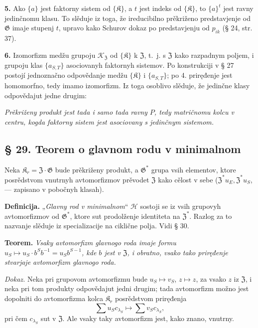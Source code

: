 \documentclass[11pt]{article}
\begin{document}
\noindent\textbf{5.} Ako \(\{a\}\) jest faktorny sistem od \(\{\mathfrak K\}\), a \(t\) jest indeks od \(\{\mathfrak K\}\), to \(\{a\}^t\) jest ravny jedinčnomu klasu. To slěduje iz toga, že ireducibilno prěkriženo predstavjenje od \(\mathfrak G\) imaje stupenj \(t\), upravo kako Schurov dokaz po predstavjenju od \(p_{ik}\) (§ 24, str. 37).

\noindent\textbf{6.} Izomorfizm medžu grupoju \(\mathscr K_{\mathfrak Z}\) od \(\{\mathfrak K\}\) k \(\mathfrak Z\), t.~j. s \(\mathfrak Z\) kako razpadnym poljem, i grupoju klas \(\{a_{S,T}\}\) asociovanyh faktornyh sistemov. Po konstrukciji v § 27 postojí jednoznačno odpovědanje medžu \(\{\mathfrak K\}\) i \(\{a_{S,T}\}\); po 4. priręđenje jest homomorfno, tedy imamo izomorfizm. Iz toga osoblivo slěduje, že jedinčne klasy odpovědajut jedne drugim:

\noindent\emph{Prěkriženy produkt jest tada i samo tada ravny \(P\), tedy matričnomu kolcu v centru, kogda faktorny sistem jest asociovany s jedinčnym sistemom.}

\subsection*{§ 29. Teorem o glavnom rodu v minimalnom}\label{hauptgeschlechtssatz-im-minimalen}

Neka \(\mathfrak K_r=\mathfrak Z\cdot\mathfrak G\) bude prěkriženy produkt, a \(\mathfrak G^*\) grupa vsih elementov, ktore posrědstvom vnutrnyh avtomorfizmov prěvodet \(\mathfrak Z\) kako cělost v sebe (\(\mathfrak Z^*u_E,\mathfrak Z^*u_S\), --- zapisano v pobočnyh klasah).

\noindent\textbf{Definicija.} „\emph{Glavny rod v minimalnom}“ \(\mathscr H\) sostoji se iz vsih grupovyh avtomorfizmov od \(\mathfrak G^*\), ktore sut prodolženje identiteta na \(\mathfrak Z^*\). Razlog za to nazvanje slěduje iz specializacije na ciklične polja. Vidi § 30.

\noindent\textbf{Teorem.} \emph{Vsaky avtomorfizm glavnogo roda imaje formu \(u_S\mapsto u_S\cdot b^Sb^{-1}=u_Sb^{S-1}\), kde \(b\) jest v \(\mathfrak Z\), i obratno, vsako tako priręđenje stvarjaje avtomorfizm glavnogo roda.}

\noindent\emph{Dokaz.} Neka pri grupovom avtomorfizmu bude \(u_S\mapsto v_S\), \(z\mapsto z\), za vsako \(z\) iz \(\mathfrak Z\), i neka pri tom produkty odpovědajut jedni drugim; tada avtomorfizm možno jest dopolniti do avtomorfizma kolca \(\mathfrak K_r\) posrědstvom priręđenja
\[
\sum u_Sc_{\lambda_S}\mapsto\sum v_Sc_{\lambda_S},
\]
pri čem \(c_{\lambda_S}\) sut v \(\mathfrak Z\). Ale vsaky taky avtomorfizm jest, kako znano, vnutrny.
\end{document}
